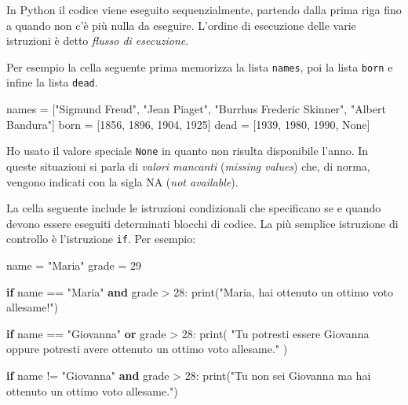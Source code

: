 \documentclass[
  letterpaper,
  krantz2]{{[}./krantz{]}}
\newenvironment{Shaded}{\begin{snugshade}}{\end{snugshade}}
\newcommand{\BuiltInTok}[1]{\textcolor[rgb]{0.00,0.23,0.31}{#1}}
\newcommand{\ControlFlowTok}[1]{\textcolor[rgb]{0.00,0.23,0.31}{\textbf{#1}}}
\newcommand{\DecValTok}[1]{\textcolor[rgb]{0.68,0.00,0.00}{#1}}
\newcommand{\KeywordTok}[1]{\textcolor[rgb]{0.00,0.23,0.31}{\textbf{#1}}}
\newcommand{\NormalTok}[1]{\textcolor[rgb]{0.00,0.23,0.31}{#1}}
\newcommand{\OperatorTok}[1]{\textcolor[rgb]{0.37,0.37,0.37}{#1}}
\newcommand{\StringTok}[1]{\textcolor[rgb]{0.13,0.47,0.30}{#1}}
\newcommand{\VariableTok}[1]{\textcolor[rgb]{0.07,0.07,0.07}{#1}}
\begin{document}
In Python il codice viene eseguito sequenzialmente, partendo dalla prima
riga fino a quando non c'è più nulla da eseguire. L'ordine di esecuzione
delle varie istruzioni è detto \emph{flusso di esecuzione}.

Per esempio la cella seguente prima memorizza la lista \texttt{names},
poi la lista \texttt{born} e infine la lista \texttt{dead}.

\begin{Shaded}
\begin{Highlighting}[]
\NormalTok{names }\OperatorTok{=}\NormalTok{ [}\StringTok{"Sigmund Freud"}\NormalTok{, }\StringTok{"Jean Piaget"}\NormalTok{, }\StringTok{"Burrhus Frederic Skinner"}\NormalTok{, }\StringTok{"Albert Bandura"}\NormalTok{]}
\NormalTok{born }\OperatorTok{=}\NormalTok{ [}\DecValTok{1856}\NormalTok{, }\DecValTok{1896}\NormalTok{, }\DecValTok{1904}\NormalTok{, }\DecValTok{1925}\NormalTok{]}
\NormalTok{dead }\OperatorTok{=}\NormalTok{ [}\DecValTok{1939}\NormalTok{, }\DecValTok{1980}\NormalTok{, }\DecValTok{1990}\NormalTok{, }\VariableTok{None}\NormalTok{]}
\end{Highlighting}
\end{Shaded}

Ho usato il valore speciale \texttt{None} in quanto non risulta
disponibile l'anno. In queste situazioni si parla di \emph{valori
mancanti} (\emph{missing values}) che, di norma, vengono indicati con la
sigla NA (\emph{not available}).

La cella seguente include le istruzioni condizionali che specificano se
e quando devono essere eseguiti determinati blocchi di codice. La più
semplice istruzione di controllo è l'istruzione \texttt{if}. Per
esempio:

\begin{Shaded}
\begin{Highlighting}[]
\NormalTok{name }\OperatorTok{=} \StringTok{"Maria"}
\NormalTok{grade }\OperatorTok{=} \DecValTok{29}

\ControlFlowTok{if}\NormalTok{ name }\OperatorTok{==} \StringTok{"Maria"} \KeywordTok{and}\NormalTok{ grade }\OperatorTok{\textgreater{}} \DecValTok{28}\NormalTok{:}
    \BuiltInTok{print}\NormalTok{(}\StringTok{"Maria, hai ottenuto un ottimo voto all\textquotesingle{}esame!"}\NormalTok{)}

\ControlFlowTok{if}\NormalTok{ name }\OperatorTok{==} \StringTok{"Giovanna"} \KeywordTok{or}\NormalTok{ grade }\OperatorTok{\textgreater{}} \DecValTok{28}\NormalTok{:}
    \BuiltInTok{print}\NormalTok{(}
        \StringTok{"Tu potresti essere Giovanna oppure potresti avere ottenuto un ottimo voto all\textquotesingle{}esame."}
\NormalTok{    )}

\ControlFlowTok{if}\NormalTok{ name }\OperatorTok{!=} \StringTok{"Giovanna"} \KeywordTok{and}\NormalTok{ grade }\OperatorTok{\textgreater{}} \DecValTok{28}\NormalTok{:}
    \BuiltInTok{print}\NormalTok{(}\StringTok{"Tu non sei Giovanna ma hai ottenuto un ottimo voto all\textquotesingle{}esame."}\NormalTok{)}
\end{Highlighting}
\end{Shaded}
\end{document}
